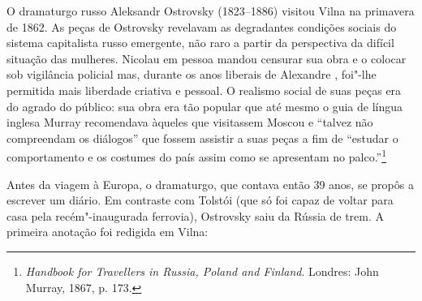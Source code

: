 O dramaturgo russo Aleksandr Ostrovsky (1823--1886) visitou Vilna na
primavera de 1862. As peças de Ostrovsky revelavam as degradantes
condições sociais do sistema capitalista russo emergente, não raro a
partir da perspectiva da difícil situação das mulheres. Nicolau  em
pessoa mandou censurar sua obra e o colocar sob vigilância policial mas,
durante os anos liberais de Alexandre , foi"-lhe permitida mais
liberdade criativa e pessoal. O realismo social de suas peças era do
agrado do público: sua obra era tão popular que até mesmo o guia de
língua inglesa Murray recomendava àqueles que visitassem Moscou e
``talvez não compreendam os diálogos'' que fossem assistir a suas peças
a fim de ``estudar o comportamento e os costumes do país assim como se
apresentam no palco.''\footnote{\textit{Handbook for Travellers in Russia, Poland and Finland}. Londres: John Murray, 1867, p. 173.}

Antes da viagem à Europa, o dramaturgo, que contava então 39 anos, se
propôs a escrever um diário. Em contraste com Tolstói (que só foi capaz
de voltar para casa pela recém"-inaugurada ferrovia), Ostrovsky saiu da
Rússia de trem. A primeira anotação foi redigida em Vilna:

